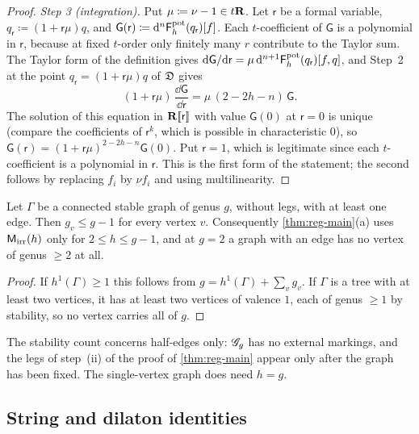 \begin{proof}
\emph{Step 3 (integration).} Put $\mu\coloneqq\nu-1\in t\mathbf{R}$. Let $\mathsf{r}$ be a formal variable, $q_{\mathsf{r}}\coloneqq(1+\mathsf{r}\mu)q$, and $\mathsf{G}(\mathsf{r})\coloneqq\mathrm{d}^n\mathsf{F}^{\mathrm{pot}}_h(q_{\mathsf{r}})[f]$. Each $t$-coefficient of $\mathsf{G}$ is a polynomial in $\mathsf{r}$, because at fixed $t$-order only finitely many $r$ contribute to the Taylor sum. The Taylor form of the definition gives $\mathrm{d}\mathsf{G}/\mathrm{d}\mathsf{r}=\mu\,\mathrm{d}^{n+1}\mathsf{F}^{\mathrm{pot}}_h(q_{\mathsf{r}})[f,q]$, and Step~2 at the point $q_{\mathsf{r}}=(1+\mathsf{r}\mu)q$ of $\mathfrak{D}$ gives
\[
(1+\mathsf{r}\mu)\,\frac{\dd\mathsf{G}}{\dd\mathsf{r}}=\mu\,(2-2h-n)\,\mathsf{G}.
\]
The solution of this equation in $\mathbf{R}[\![ \mathsf{r} ]\!]$ with value $\mathsf{G}(0)$ at $\mathsf{r}=0$ is unique (compare the coefficients of $\mathsf{r}^k$, which is possible in characteristic $0$), so $\mathsf{G}(\mathsf{r})=(1+\mathsf{r}\mu)^{2-2h-n}\mathsf{G}(0)$. Put $\mathsf{r}=1$, which is legitimate since each $t$-coefficient is a polynomial in $\mathsf{r}$. This is the first form of the statement; the second follows by replacing $f_i$ by $\nu f_i$ and using multilinearity.
\end{proof}

\begin{lem}
\label{lem:reg-range}
Let $\Gamma$ be a connected stable graph of genus $g$, without legs, with at least one edge. Then $g_v\leq g-1$ for every vertex $v$. Consequently \cref{thm:reg-main}(a) uses $\mathsf{M}_{\mathrm{irr}}(h)$ only for $2\leq h\leq g-1$, and at $g=2$ a graph with an edge has no vertex of genus $\geq 2$ at all.
\end{lem}

\begin{proof}
If $h^1(\Gamma)\geq 1$ this follows from $g=h^1(\Gamma)+\sum_vg_v$. If $\Gamma$ is a tree with at least two vertices, it has at least two vertices of valence $1$, each of genus $\geq 1$ by stability, so no vertex carries all of $g$.
\end{proof}

The stability count concerns half-edges only: $\mathscr{G}_g$ has no external markings, and the legs of step~(ii) of the proof of \cref{thm:reg-main} appear only after the graph has been fixed. The single-vertex graph does need $h=g$.

\subsection{String and dilaton identities}
\label{sec:reg-string}

